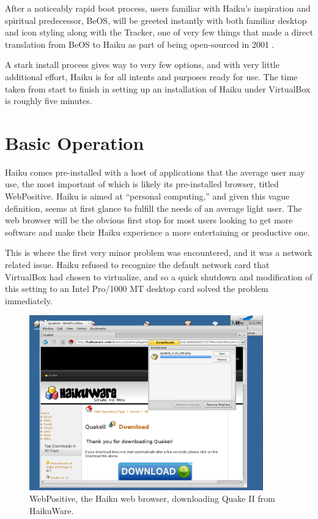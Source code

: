 \documentclass{article}
\begin{document}
After a noticeably rapid boot process, users familiar with Haiku's
inspiration and spiritual predecessor, BeOS, will be greeted instantly
with both familiar desktop and icon styling along with the Tracker,
one of very few things that made a direct translation from BeOS to
Haiku as part of being open-sourced in 2001 \cite{HaikuFaq}.

A stark install process gives way to very few options, and with very
little additional effort, Haiku is for all intents and purposes ready
for use.  The time taken from start to finish in setting up an
installation of Haiku under VirtualBox is roughly five minutes.

\section{Basic Operation}

Haiku comes pre-installed with a host of applications that the average
user may use, the most important of which is likely its pre-installed
browser, titled WebPositive.  Haiku is aimed at ``personal
computing,'' and given this vague definition, seems at first glance to
fulfill the needs of an average light user. The web browser will be
the obvious first stop for most users looking to get more software and
make their Haiku experience a more entertaining or productive one.
	
This is where the first very minor problem was encountered, and it was
a network related issue. Haiku refused to recognize the default
network card that VirtualBox had chosen to virtualize, and so a quick
shutdown and modification of this setting to an Intel Pro/1000 MT
desktop card solved the problem immediately.
	
\begin{figure}[h]
\centering
\includegraphics[width=0.9\textwidth]{figs/using-quake-download.png}
\caption{WebPositive, the Haiku web browser, downloading Quake II from
  HaikuWare.}
\label{fig:using-quake-download}
\end{figure}
\end{document}

